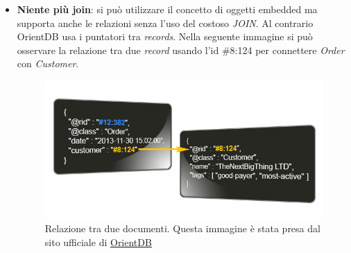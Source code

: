 \begin{itemize}
	\item \textbf{Niente più join}: si può utilizzare il concetto di oggetti embedded ma supporta anche le relazioni senza l'uso del costoso \textit{JOIN}. Al contrario OrientDB usa i puntatori tra \textit{records}. Nella seguente immagine si può osservare la relazione tra due \textit{record} usando l'id \#8:124 per connettere \textit{Order} con \textit{Customer}.
	\begin{figure}[h]
	\centering
	\includegraphics[width=0.8\linewidth]{immagini/json_linked3}
	\caption[Relazione tra due documenti]{Relazione tra due documenti. Questa immagine è stata presa dal sito ufficiale di \href{http://orientdb.com/orientdb-vs-mongodb/}{OrientDB}}
	\label{fig:json_linked3}
	\end{figure}
	


\end{itemize}
